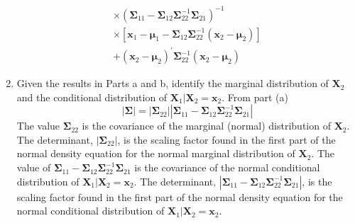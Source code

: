 \begin{enumerate}[label=(\alph*)]
\begin{multline*}
        \times {(\bm{\Sigma}_{11} - \bm{\Sigma}_{12}\bm{\Sigma}_{22}^{-1}\bm{\Sigma}_{21})}^{-1} \\
        \times \left[\textbf{x}_{1} - \bm{\mu}_{1} - \bm{\Sigma}_{12}\bm{\Sigma}_{22}^{-1}(\textbf{x}_{2} - \bm{\mu}_{2})\right] \\
            + {(\textbf{x}_{2} - \bm{\mu}_{2})}^{\prime}\bm{\Sigma}_{22}^{-1} (\textbf{x}_{2} - \bm{\mu}_{2})
    \end{multline*}
    \item Given the results in Parts a and b, identify the marginal distribution of $\textbf{X}_{2}$ and the conditional distribution of $\textbf{X}_{1} \big| \textbf{X}_{2} = \textbf{x}_{2}$.
    \newline
    \newline
    From part (a)
    \[
        \left|\bm{\Sigma}\right|
        =
        \left|\bm{\Sigma}_{22}\right|
        \left|\bm{\Sigma}_{11} - \bm{\Sigma}_{12}\bm{\Sigma}_{22}^{-1}\bm{\Sigma}_{21}\right|
    \]
    The value $\bm{\Sigma}_{22}$ is the covariance of the marginal (normal) distribution of $\textbf{X}_2$. The determinant, $\left|\bm{\Sigma}_{22}\right|$, is the scaling factor found in the first part of the normal density equation for the normal marginal distribution of $\textbf{X}_2$.
    \newline
    \newline
    The value of $\bm{\Sigma}_{11} - \bm{\Sigma}_{12}\bm{\Sigma}_{22}^{-1}\bm{\Sigma}_{21}$ is the covariance of the normal conditional distribution of 
    $\textbf{X}_1 \big| \textbf{X}_2 = \textbf{x}_2$. The determinant, $\left|\bm{\Sigma}_{11} - \bm{\Sigma}_{12}\bm{\Sigma}_{22}^{-1}\bm{\Sigma}_{21}\right|$, is the scaling factor found in the first part of the normal density equation for the normal conditional distribution of $\textbf{X}_1 \big| \textbf{X}_2 = \textbf{x}_2$.


\end{enumerate}

